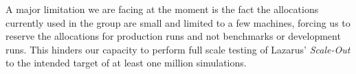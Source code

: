 \documentclass[a4paper,10pt]{article}
\begin{document}
A major limitation we are facing at the moment is the fact the allocations currently used in the group
are small and limited to a few machines, forcing us to reserve the allocations for production runs and not 
benchmarks or development runs. This hinders our capacity to perform full scale testing
of Lazarus' {\it Scale-Out} to the intended target of at least one million simulations.









\end{document}
